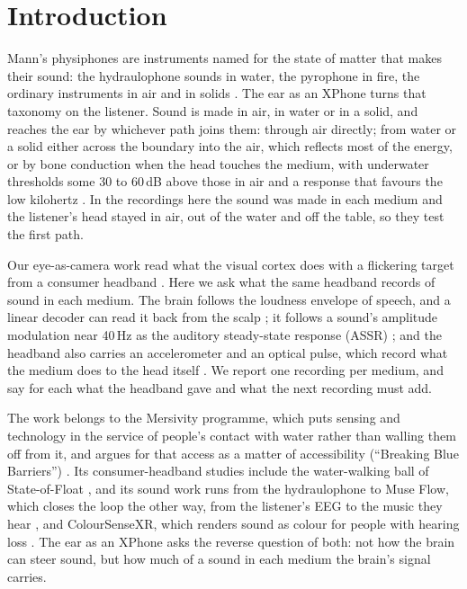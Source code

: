 \documentclass[conference]{IEEEtran}
\begin{document}
\section{Introduction}

Mann's physiphones are instruments named for the state of matter that makes their sound: the hydraulophone sounds in water, the pyrophone in fire, the ordinary instruments in air and in solids \cite{mann2005fluid, mann2006hydraulophone, mann2007physiphones}. The ear as an XPhone turns that taxonomy on the listener. Sound is made in air, in water or in a solid, and reaches the ear by whichever path joins them: through air directly; from water or a solid either across the boundary into the air, which reflects most of the energy, or by bone conduction when the head touches the medium, with underwater thresholds some 30 to 60\,dB above those in air and a response that favours the low kilohertz \cite{brandt1967underwater, hollien1969underwater}. In the recordings here the sound was made in each medium and the listener's head stayed in air, out of the water and off the table, so they test the first path.

Our eye-as-camera work read what the visual cortex does with a flickering target from a consumer headband \cite{mann2019eye}. Here we ask what the same headband records of sound in each medium. The brain follows the loudness envelope of speech, and a linear decoder can read it back from the scalp \cite{osullivan2015cocktail, accou2023vlaai}; it follows a sound's amplitude modulation near 40\,Hz as the auditory steady-state response (ASSR) \cite{galambos1981assr, picton2003assr}; and the headband also carries an accelerometer and an optical pulse, which record what the medium does to the head itself \cite{allen2007ppg, scholkmann2014fnirs}. We report one recording per medium, and say for each what the headband gave and what the next recording must add.

The work belongs to the Mersivity programme, which puts sensing and technology in the service of people's contact with water rather than walling them off from it, and argues for that access as a matter of accessibility (``Breaking Blue Barriers'') \cite{mann2025blue}. Its consumer-headband studies include the water-walking ball of State-of-Float \cite{mann2025floatsymp, mann2026float}, and its sound work runs from the hydraulophone \cite{mann2006hydraulophone} to Muse Flow, which closes the loop the other way, from the listener's EEG to the music they hear \cite{huang2025museflow}, and ColourSenseXR, which renders sound as colour for people with hearing loss \cite{xiao2025coloursense}. The ear as an XPhone asks the reverse question of both: not how the brain can steer sound, but how much of a sound in each medium the brain's signal carries.
\end{document}
